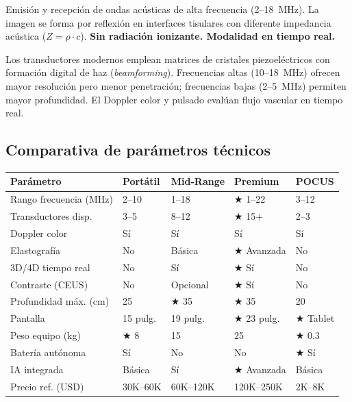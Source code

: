 \documentclass[11pt, a4paper]{article}
\begin{document}
\begin{principiobox}
Emisión y recepción de ondas acústicas de alta frecuencia (2--18~MHz). La imagen se forma
por reflexión en interfaces tisulares con diferente impedancia acústica ($Z = \rho \cdot c$).
\textbf{Sin radiación ionizante. Modalidad en tiempo real.}
\end{principiobox}

\vspace{6pt}
Los transductores modernos emplean matrices de cristales piezoeléctricos con formación
digital de haz (\textit{beamforming}). Frecuencias altas (10--18~MHz) ofrecen mayor
resolución pero menor penetración; frecuencias bajas (2--5~MHz) permiten mayor profundidad.
El Doppler color y pulsado evalúan flujo vascular en tiempo real.

\subsection{Comparativa de parámetros técnicos}

\begin{center}
\renewcommand{\arraystretch}{1.25}
\begin{tabular}{P{4.2cm} C{2.5cm} C{2.5cm} C{2.5cm} C{2.5cm}}
\toprule
{}
\textbf{\color{white}Parámetro} &
\textbf{\color{white}Portátil} &
\textbf{\color{white}Mid-Range} &
\textbf{\color{white}Premium} &
\textbf{\color{white}POCUS} \\
\midrule
Rango frecuencia (MHz)     & 2--10 & 1--18 & $\bigstar$ 1--22 & 3--12 \\
Transductores disp.        & 3--5 & 8--12 & $\bigstar$ 15+ & 2--3 \\
Doppler color              & Sí & Sí & Sí & Sí \\
Elastografía               & No & Básica & $\bigstar$ Avanzada & No \\
3D/4D tiempo real          & No & Sí & $\bigstar$ Sí & No \\
Contraste (CEUS)           & No & Opcional & $\bigstar$ Sí & No \\
Profundidad máx. (cm)      & 25 & $\bigstar$ 35 & $\bigstar$ 35 & 20 \\
Pantalla                   & 15 pulg. & 19 pulg. & $\bigstar$ 23 pulg. & $\bigstar$ Tablet \\
Peso equipo (kg)           & $\bigstar$ 8 & 15 & 25 & $\bigstar$ 0.3 \\
Batería autónoma           & Sí & No & No & $\bigstar$ Sí \\
IA integrada               & Básica & Sí & $\bigstar$ Avanzada & Básica \\
Precio ref. (USD)          & 30K--60K & 60K--120K & 120K--250K & 2K--8K \\
\bottomrule
\end{tabular}
\end{center}
\end{document}
